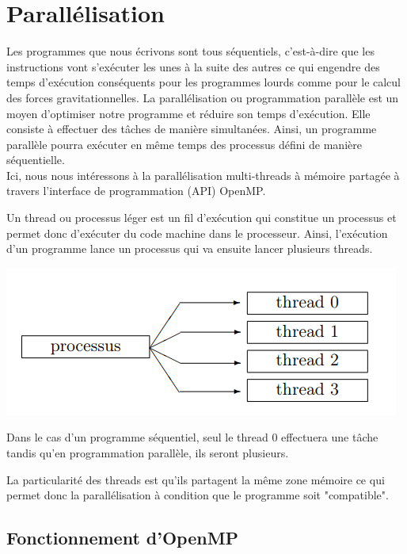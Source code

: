 \chapter{Parallélisation }
Les programmes que nous écrivons sont tous séquentiels, c'est-à-dire que les instructions vont s'exécuter les unes à la suite des autres ce qui engendre des temps d'exécution conséquents pour les programmes lourds comme pour le calcul des forces gravitationnelles.
La parallélisation ou programmation parallèle est un moyen d'optimiser notre programme et réduire son temps d'exécution. 
Elle consiste à effectuer des tâches de manière simultanées. Ainsi, un programme parallèle pourra exécuter en même temps des processus défini de manière séquentielle.\\

Ici, nous nous intéressons à la parallélisation multi-threads à mémoire partagée à travers l'interface de programmation (API) OpenMP.

Un thread ou processus léger est un fil d'exécution qui constitue un processus et permet donc d'exécuter du code machine dans le processeur. Ainsi, l'exécution d'un programme lance un processus qui va ensuite lancer plusieurs threads.


\begin{center}
\includegraphics[scale=0.8]{images/process_thread.png}
\label{fig4}
\end{center} 

Dans le cas d'un programme séquentiel, seul le thread 0 effectuera une tâche tandis qu'en programmation parallèle, ils seront plusieurs.

La particularité des threads est qu'ils partagent la même zone mémoire ce qui permet donc la parallélisation à condition que le programme soit "compatible".

\section{Fonctionnement d'OpenMP}
